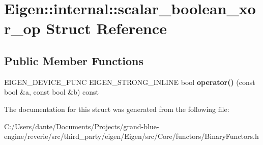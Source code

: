 \hypertarget{struct_eigen_1_1internal_1_1scalar__boolean__xor__op}{}\section{Eigen\+::internal\+::scalar\+\_\+boolean\+\_\+xor\+\_\+op Struct Reference}
\label{struct_eigen_1_1internal_1_1scalar__boolean__xor__op}
\subsection*{Public Member Functions}
\begin{DoxyCompactItemize}
\item 
\mbox{\label{struct_eigen_1_1internal_1_1scalar__boolean__xor__op_a42494aeee806e9196460f5e1608c6678}} 
E\+I\+G\+E\+N\+\_\+\+D\+E\+V\+I\+C\+E\+\_\+\+F\+U\+NC E\+I\+G\+E\+N\+\_\+\+S\+T\+R\+O\+N\+G\+\_\+\+I\+N\+L\+I\+NE bool {\bfseries operator()} (const bool \&a, const bool \&b) const
\end{DoxyCompactItemize}


The documentation for this struct was generated from the following file\+:\begin{DoxyCompactItemize}
\item 
C\+:/\+Users/dante/\+Documents/\+Projects/grand-\/blue-\/engine/reverie/src/third\+\_\+party/eigen/\+Eigen/src/\+Core/functors/Binary\+Functors.\+h\end{DoxyCompactItemize}
